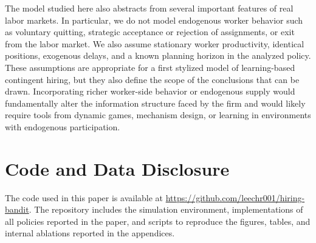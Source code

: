 \documentclass[opre,blindrev]{informs3}
\begin{document}
The model studied here also abstracts from several important features of real labor markets. In particular, we do not model endogenous worker behavior such as voluntary quitting, strategic acceptance or rejection of assignments, or exit from the labor market. We also assume stationary worker productivity, identical positions, exogenous delays, and a known planning horizon in the analyzed policy. These assumptions are appropriate for a first stylized model of learning-based contingent hiring, but they also define the scope of the conclusions that can be drawn. Incorporating richer worker-side behavior or endogenous supply would fundamentally alter the information structure faced by the firm and would likely require tools from dynamic games, mechanism design, or learning in environments with endogenous participation.



\section{Code and Data Disclosure}\label{sec:code-data-disclosure}
The code used in this paper is available at \url{https://github.com/leechr001/hiring-bandit}. The repository includes the simulation environment, implementations of all policies reported in the paper, and scripts to reproduce the figures, tables, and internal ablations reported in the appendices. 





%
%
%
\end{document}

